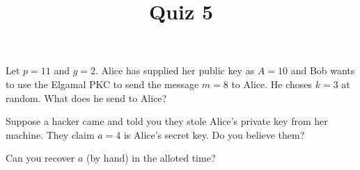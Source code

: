 \documentclass[12pt]{amsart}
\theoremstyle{definition}
\begin{document}
\title{Quiz 5}

\maketitle

Let $p = 11$ and $g = 2$. Alice has supplied her public key as $A = 10$ and 
Bob wants to use the Elgamal PKC to send the message $m = 8$ to 
Alice. He choses $k = 3$ at random. What does he send to Alice?

Suppose a hacker came and told you they stole Alice's private key from 
her machine. They claim $a = 4$ is Alice's secret key. Do you believe them?

Can you recover $a$ (by hand) in the alloted time? 
\end{document}
